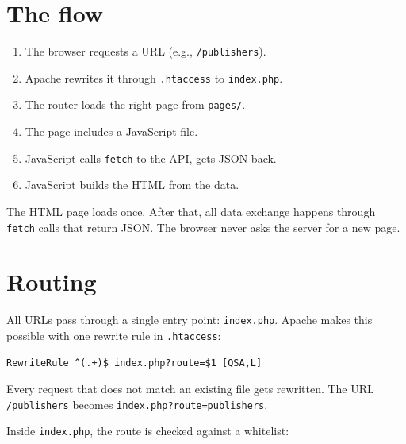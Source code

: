 \documentclass[11pt,a4paper,oneside]{book}
\newenvironment{Shaded}{\begin{snugshade}}{\end{snugshade}}
\newcommand{\StringTok}[1]{\textcolor[HTML]{4070A0}{#1}}
\newcommand{\OtherTok}[1]{\textcolor[HTML]{007020}{#1}}
\newcommand{\VariableTok}[1]{\textcolor[HTML]{19177C}{#1}}
\newcommand{\OperatorTok}[1]{\textcolor[HTML]{666666}{#1}}
\newcommand{\NormalTok}[1]{#1}
\providecommand{\tightlist}{%
  \setlength{\itemsep}{0pt}\setlength{\parskip}{0pt}}
\begin{document}
\hypertarget{the-flow}{%
\section{The flow}\label{the-flow}}

\begin{enumerate}
\def\labelenumi{\arabic{enumi}.}
\tightlist
\item
  The browser requests a URL (e.g., \texttt{/publishers}).
\item
  Apache rewrites it through \texttt{.htaccess} to
  \texttt{index.php}.
\item
  The router loads the right page from \texttt{pages/}.
\item
  The page includes a JavaScript file.
\item
  JavaScript calls \texttt{fetch} to the API, gets JSON back.
\item
  JavaScript builds the HTML from the data.
\end{enumerate}

The HTML page loads once. After that, all data exchange happens
through \texttt{fetch} calls that return JSON. The browser never
asks the server for a new page.

\hypertarget{routing}{%
\section{Routing}\label{routing}}

All URLs pass through a single entry point: \texttt{index.php}.
Apache makes this possible with one rewrite rule in
\texttt{.htaccess}:

\begin{verbatim}
RewriteRule ^(.+)$ index.php?route=$1 [QSA,L]
\end{verbatim}

Every request that does not match an existing file gets
rewritten. The URL \texttt{/publishers} becomes
\texttt{index.php?route=publishers}.

Inside \texttt{index.php}, the route is checked against a
whitelist:

\begin{Shaded}
\end{Shaded}
\end{document}
